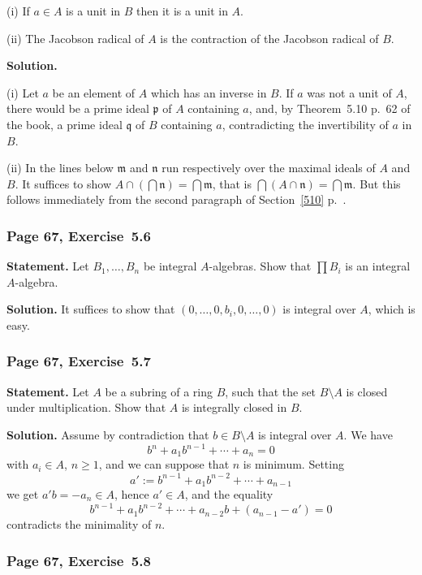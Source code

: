 \documentclass[12pt,letterpaper]{article}%
\newcommand{\mf}{\mathfrak}
\newcommand{\mmm}{\mf m}
\newcommand{\nnn}{\mf n}
\newcommand{\ppp}{\mf p}
\newcommand{\qqq}{\mf q}
\newcommand{\nn}{\noindent}
\begin{document}
\nn(i) If $a\in A$ is a unit in $B$ then it is a unit in $A$.

\nn(ii) The Jacobson radical of $A$ is the contraction of the Jacobson radical of $B$. 

\nn\textbf{Solution.} 

\nn(i) Let $a$ be an element of $A$ which has an inverse in $B$. If $a$ was not a unit of $A$, there would be a prime ideal $\ppp$ of $A$ containing $a$, and, by Theorem~5.10 p.~62 of the book, a prime ideal $\qqq$ of $B$ containing $a$, contradicting the invertibility of $a$ in $B$. 

\nn(ii) In the lines below $\mmm$ and $\nnn$ run respectively over the maximal ideals of $A$ and $B$. It suffices to show $A\cap(\bigcap\nnn)=\bigcap\mmm$, that is $\bigcap(A\cap\nnn)=\bigcap\mmm$. But this follows immediately from the second paragraph of Section~\ref{510} p.~\pageref{510}. 

\subsubsection{Page 67, Exercise~5.6}%

\textbf{Statement.} Let $B_1,\ldots,B_n$ be integral $A$-algebras. Show that $\prod B_i$ is an integral $A$-algebra.

\nn\textbf{Solution.} It suffices to show that $(0,\dots,0,b_i,0,\dots,0)$ is integral over $A$, which is easy. 

\subsubsection{Page 67, Exercise~5.7}%

\textbf{Statement.} Let $A$ be a subring of a ring $B$, such that the set $B\setminus A$ is closed under multiplication. Show that $A$ is integrally closed in $B$.

\nn\textbf{Solution.} Assume by contradiction that $b\in B\setminus A$ is integral over $A$. We have 
$$
b^n+a_1b^{n-1}+\cdots+a_n=0
$$ 
with $a_i\in A$, $n\ge1$, and we can suppose that $n$ is minimum. Setting 
$$
a':=b^{n-1}+a_1b^{n-2}+\cdots+a_{n-1}
$$
we get $a'b=-a_n\in A$, hence $a'\in A$, and the equality 
$$
b^{n-1}+a_1b^{n-2}+\cdots+a_{n-2}b+(a_{n-1}-a')=0
$$ 
contradicts the minimality of $n$. 

\subsubsection{Page 67, Exercise~5.8}%
\end{document}
